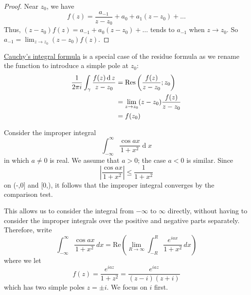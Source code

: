\documentclass[12pt]{article}
\renewcommand{\d}{\ensuremath{\operatorname{d}}}
\begin{document}
\begin{proof}
    Near $z_0$, we have \[f(z) = \frac{a_{-1}}{z-z_0}+a_0+a_1(z-z_0)+\dots\]
    Thus, $(z-z_0)f(z)=a_{-1}+a_0(z-z_0)+\dots$ tends to $a_{-1}$ when $z\to z_0$. So $a_{-1}=\lim_{z\to z_0}(z-z_0)f(z)$.
\end{proof}

\rmk \hyperlink{cauchys-integral-formula}{Cauchy's integral formula} is a special case of the residue formula as we rename the function to introduce a simple pole at $z_0$: \begin{align*}
    \frac{1}{2\pi i}\int_{\gamma}\frac{f(z)\d z}{z-z_0} &= \Res\left(\frac{f(z)}{z-z_0};z_0\right)\\
    &= \lim_{z\to z_0}(z-z_0)\frac{f(z)}{z-z_0}\\
    &=f(z_0)
\end{align*}

\eg Consider the improper integral
\[\int_{-\infty}^{\infty}{\frac{\cos a x}{1+x^{2}}}\d x\]
in which $a \neq 0$ is real. We assume that $a > 0$; the case $a < 0$ is similar. Since\[\left|\frac{\cos a x}{1+x^{2}}\right|\leq \frac{1}{1+x^{2}}\] on (-\infty,0] and [0,\infty), it follows that the improper integral converges by the comparison test. 

This allows us to consider the integral from $-\infty$ to $\infty$ directly, without having to consider the improper integrals over the positive and negative parts separately. Therefore, write \[\int_{-\infty}^{\infty}\frac{\cos a x}{1+x^{2}}\,d x=\mathrm{Re}\left(\operatorname*{lim}_{R\rightarrow\infty}\int_{-R}^{R}\frac{e^{i a x}}{1+x^{2}}\,d x\right)
\] where we let \[f(z)=\frac{e^{i a z}}{1+z^{2}}=\frac{e^{i a z}}{(z-i)(z+i)}\]
which has two simple poles $z=\pm i$. We focus on $i$ first.
\end{document}
